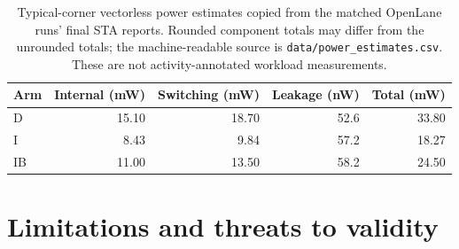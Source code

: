 \documentclass[10pt,a4paper]{article}
\begin{document}
\begin{table}[!htbp]
\centering
\small
\begin{tabular}{lrrrr}
\toprule
Arm & Internal (mW) & Switching (mW) & Leakage (nW) & Total (mW)\\
\midrule
D & 15.10 & 18.70 & 52.6 & 33.80\\
I & 8.43 & 9.84 & 57.2 & 18.27\\
IB & 11.00 & 13.50 & 58.2 & 24.50\\
\bottomrule
\end{tabular}
\caption{Typical-corner vectorless power estimates copied from the matched
OpenLane runs' final STA reports. Rounded component totals may differ from
the unrounded totals; the machine-readable source is
\texttt{data/power\_estimates.csv}. These are not activity-annotated workload
measurements.}
\label{tab:power-estimates}
\end{table}

\section{Limitations and threats to validity}
\end{document}
